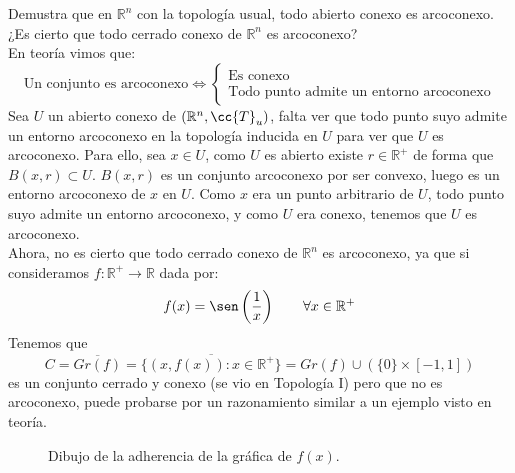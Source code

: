 \begin{ejercicio}
   Demustra que en $\mathbb{R}^n$  con la topología usual, todo abierto conexo es arcoconexo. ¿Es cierto que todo cerrado conexo de $\mathbb{R}^n$ es arcoconexo?\\

   \noindent
   En teoría vimos que:
   \begin{equation*}
       \text{Un conjunto es arcoconexo} \Longleftrightarrow \left\{\begin{array}{l}
           \text{Es conexo} \\
           \text{Todo punto admite un entorno arcoconexo}
       \end{array}\right.
   \end{equation*}
   Sea $U$ un abierto conexo de $(\mathbb{R}^n, \cc{T}_u)$, falta ver que todo punto suyo admite un entorno arcoconexo en la topología inducida en $U$ para ver que $U$ es arcoconexo. Para ello, sea $x\in U$, como $U$ es abierto existe $r\in \mathbb{R}^+$ de forma que $B(x,r)\subset U$. $B(x,r)$ es un conjunto arcoconexo por ser convexo, luego es un entorno arcoconexo de $x$ en $U$. Como $x$ era un punto arbitrario de $U$, todo punto suyo admite un entorno arcoconexo, y como $U$ era conexo, tenemos que $U$ es arcoconexo.\\

   \noindent
   Ahora, no es cierto que todo cerrado conexo de $\mathbb{R}^n$ es arcoconexo, ya que si consideramos $f:\mathbb{R}^+\to \mathbb{R}$ dada por:
   \begin{equation*}
       f(x) = \sen\left(\dfrac{1}{x}\right) \qquad \forall x\in \mathbb{R}^+
   \end{equation*}
   Tenemos que
   \begin{equation*}
       C = \overline{Gr(f)} = \overline{\{(x,f(x)) : x\in \mathbb{R}^+\}} = Gr(f) \cup (\{0\}\times [-1,1])
   \end{equation*}
   es un conjunto cerrado y conexo (se vio en Topología I) pero que no es arcoconexo, puede probarse por un razonamiento similar a un ejemplo visto en teoría.

   \begin{figure}[H]
       \centering
        \caption{Dibujo de la adherencia de la gráfica de $f(x)$.}
   \end{figure}
\end{ejercicio}

